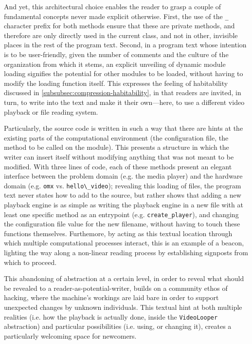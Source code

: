 And yet, this architectural choice enables the reader to grasp a couple of fundamental concepts never made explicit otherwise. First, the use of the \lstinline{_} character prefix for both methods ensure that these are private methods, and therefore are only directly used in the current class, and not in other, invisible places in the rest of the program text. Second, in a program text whose intention is to be user-friendly, given the number of comments and the culture of the organization from which it stems, an explicit unveiling of dynamic module loading signifies the potential for other modules to be loaded, without having to modify the loading function itself. This expresses the feeling of habitability discussed in \autoref{subsubsec:compression-habitability}, in that readers are invited, in turn, to write into the text and make it their own—here, to use a different video playback or file reading system.

Particularly, the source code is written in such a way that there are hints at the existing parts of the computational environment (the configuration file, the method to be called on the module). This presents a structure in which the writer can insert itself without modifying anything that was not meant to be modified. With three lines of code, each of these methods present an elegant interface between the problem domain (e.g. the media player) and the hardware domain (e.g. \lstinline{omx} vs. \lstinline{hello\_video}); revealing this loading of files, the program text never states how to add to the source, but rather shows that adding a new playback engine is as simple as writing the playback engine in a new file with at least one specific method as an entrypoint (e.g. \lstinline{create_player}), and changing the configuration file value for the new filename, without having to touch these functions themselves. Furthemore, by acting as this textual location through which multiple computational processes interact, this is an example of a beacon, lighting the way along a non-linear reading process by establishing signposts from which to proceed.

This abandoning of abstraction at a certain level, in order to reveal what should be revealed to a reader-as-potential-writer, builds on a community ethos of hacking, where the machine's workings are laid bare in order to support unexpected changes by unknown individuals. This textual hint at both multiple realities (i.e. how the playback is actually done, inside the \lstinline{VideoLooper} abstraction) and particular possibilities (i.e. using, or changing it), creates a particularly welcoming space for newcomers.

